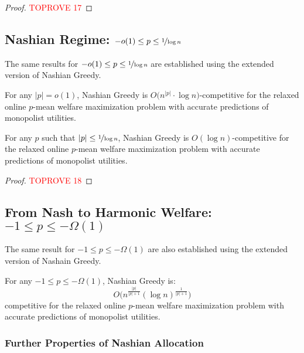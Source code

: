 \documentclass[11pt,letterpaper]{article}
\begin{document}
\begin{proof}\textcolor{red}{TOPROVE 17}\end{proof}

\subsection{Nashian Regime: $-o(1)\leq p\leq \nicefrac{1}{\log n}$}

The same results for $-o(1)\leq p\leq \nicefrac{1}{\log n}$ are established using the extended version of Nashian Greedy.

\begin{theorem}
	\label{thm:nashian-app}
	For any $|p| = o(1)$, Nashian Greedy is $O \big( n^{|p|} \cdot \log n \big)$-competitive for the relaxed online $p$-mean welfare maximization problem with accurate predictions of monopolist utilities.
\end{theorem}

\begin{corollary}
	\label{cor:nashian-app}	
	For any $p$ such that $|p| \le \nicefrac{1}{\log n}$, Nashian Greedy is $O(\log n)$-competitive for the relaxed online $p$-mean welfare maximization problem with accurate predictions of monopolist utilities.
\end{corollary}


\begin{proof}\textcolor{red}{TOPROVE 18}\end{proof}


\subsection[From Nash to Harmonic Welfare]{From Nash to Harmonic Welfare: $-1 \le p \le - \Omega(1)$}

The same result for $-1\leq p\leq -\Omega(1)$ are also established using the extended version of Nashain Greedy.

\begin{theorem}
	\label{thm:nashian-to-harmonic-app}
	For any $-1 \le p \le -	\Omega(1)$, Nashian Greedy is:
	\[
	O \Big( n^{\frac{|p|}{|p|+1}} (\log n)^{\frac{1}{|p|+1}} \Big)
	\]
	competitive for the relaxed online $p$-mean welfare maximization problem with accurate predictions of monopolist utilities.
\end{theorem}


\subsubsection{Further Properties of Nashian Allocation}
\end{document}
